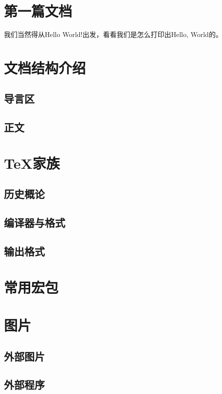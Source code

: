 \documentclass[12pt]{article}
\begin{document}
\section{第一篇文档}
我们当然得从{\ttfamily Hello World!}出发，看看我们是怎么打印出Hello, World的。



\section{文档结构介绍}
\subsection{导言区}

\subsection{正文}


\section{\TeX{}家族}
\subsection{历史概论}


\subsection{编译器与格式}


\subsection{输出格式}


\section{常用宏包}



\section{图片}
\subsection{外部图片}

\subsection{外部程序}
\end{document}
